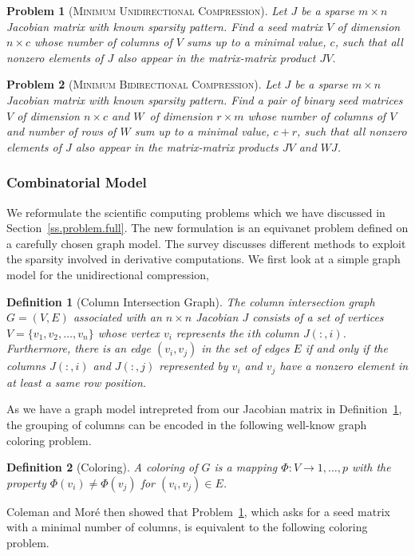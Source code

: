 \documentclass[12pt, twoside]{book}
\newtheorem{problem}{Problem}
\newtheorem{definition}{Definition}
\newcommand{\secref}[1]{Section~\protect\ref{#1}}
\newcommand{\defref}[1]{Definition~\protect\ref{#1}}
\newcommand{\col}{\ensuremath{c}}
\newcommand{\row}{\ensuremath{r}}
\newcommand{\MinUniCom}{\textsc{Minimum Unidirectional Compression}}
\newcommand{\MinBidCom}{\textsc{Minimum Bidirectional Compression}}
\begin{document}
\begin{problem}[\MinUniCom]
\label{p.seed.uni} Let $J$ be a sparse ${m\times n}$ Jacobian matrix with known sparsity
pattern. Find a seed matrix $V$ of dimension $n\times \col$
whose number of columns of $V$ sums up
to a minimal value, $\col$, such that all nonzero elements of $J$ also appear in
the matrix-matrix product $JV$.
\end{problem}

\begin{problem}[\MinBidCom]
\label{p.seed.bid} Let $J$ be a sparse ${m\times n}$ Jacobian matrix with known sparsity
pattern. Find a pair of binary seed matrices $V$ of dimension $n\times \col$ and $W$~of
dimension $\row \times m$ whose number of columns of $V$ and number of rows of $W$ sum up to a minimal value, $\col + \row$, such that all nonzero elements of $J$ also appear in
the matrix-matrix products $JV$ and $WJ$.
\end{problem}

\subsubsection{Combinatorial Model}
\label{s.modeling.full}
We reformulate the scientific computing problems which
we have discussed in \secref{ss.problem.full}.
The new formulation is an equivanet problem defined on a
carefully chosen graph model. The survey \cite{Gebremedhin05whatcolor}
discusses different methods
to exploit the sparsity involved in derivative computations.
We first look at a simple graph model for the unidirectional compression,
%
\begin{definition}[Column Intersection Graph]
\label{d:cig}
The column intersection graph $G = (V,E)$ associated with an $n \times n$ Jacobian $J$
consists of a set of vertices $V=\{v_1, v_2, \dots, v_n\}$ whose vertex $v_i$ represents
the $i$th column $J(:,i)$. Furthermore, there is an edge $(v_i,v_j)$ in the set of edges
$E$ if and only if the columns $J(:,i)$ and $J(:,j)$ represented by $v_i$ and $v_j$ have
a nonzero element in at least a same row position.
\end{definition}

As we have a graph model intrepreted from our Jacobian matrix in \defref{d:cig},
the grouping of columns can be encoded in the following well-know graph coloring problem.
%
\begin{definition}[Coloring]
A coloring of $G$ is a mapping $\Phi : V \to {1, \dots, p}$ with the property
$\Phi(v_i)\neq \Phi(v_j)$ for $(v_i,v_j) \in E$.
\end{definition}
%
Coleman and Mor\'{e} \cite{Coleman1983EoS} then showed that Problem~\ref{p.seed.uni}, which
asks for a seed matrix with a minimal number of columns, is equivalent to the following
coloring problem.
\end{document}
